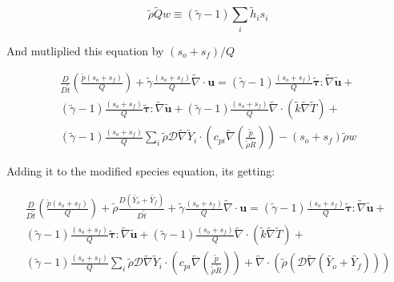 \documentclass[preprint,12pt,authoryear]{elsarticle}
\begin{document}
\begin{equation}
\tilde{\rho}\tilde{Q}w
\equiv
(\tilde{\gamma}-1)
\sum\limits_i
\tilde{h}_i
s_i	
\end{equation}

And mutliplied this equation by  $(s_o+s_f)/Q$

\begin{equation}
\begin{split}
	\frac{D }{D\tilde{t}}
	\left(
		\frac{\tilde{p}(s_o+s_f)}{Q}
	\right)
	+
	\tilde{\gamma}
	\frac{(s_o+s_f)}{Q}
	\tilde{\nabla}\cdot{\mathbf{u}}
        =
	(\tilde{\gamma}-1)
	\frac{(s_o+s_f)}{Q}
        \pmb{\tilde{\tau}}:\tilde{\nabla} \tilde{\mathbf{u}} 
        + 
	\\
	(\tilde{\gamma}-1)
	\frac{(s_o+s_f)}{Q}
        \pmb{\tilde{\tau}}:\tilde{\nabla} \tilde{\mathbf{u}} 
        + 
	(\tilde{\gamma}-1)
	\frac{(s_o+s_f)}{Q}
        \tilde{\nabla} \cdot (\tilde{k}\tilde{\nabla} \tilde{T})
        +
	\\
	(\tilde{\gamma}-1)
	\frac{(s_o+s_f)}{Q}
        \sum\limits_i 
        \tilde{\rho}
        \mathcal{D}
        \tilde{\nabla}
        \tilde{Y}_i     
        \cdot
        \left(
                c_{pi}
                \tilde{\nabla}
                \left(
                	\frac{\tilde{p}}{\tilde{\rho}\tilde{R}}
                \right)
        \right)
	- 
	(s_o+s_f)
	\tilde{\rho}w
\end{split}
\end{equation}

Adding it to the modified species equation, its getting:

\begin{equation}
\begin{split}
	\frac{D }{D\tilde{t}}
	\left(
		\frac{\tilde{p}(s_o+s_f)}{Q}
	\right)
	+
	\tilde{\rho} \frac{D  (\tilde{Y_o}+\tilde{Y_f})}{D \tilde{t}}
	+
	\tilde{\gamma}
	\frac{(s_o+s_f)}{Q}
	\tilde{\nabla}\cdot{\mathbf{u}}
        =
	(\tilde{\gamma}-1)
	\frac{(s_o+s_f)}{Q}
        \pmb{\tilde{\tau}}:\tilde{\nabla} \tilde{\mathbf{u}} 
        + 
	\\
	(\tilde{\gamma}-1)
	\frac{(s_o+s_f)}{Q}
        \pmb{\tilde{\tau}}:\tilde{\nabla} \tilde{\mathbf{u}} 
        + 
	(\tilde{\gamma}-1)
	\frac{(s_o+s_f)}{Q}
        \tilde{\nabla} \cdot (\tilde{k}\tilde{\nabla} \tilde{T})
        +
	\\
	(\tilde{\gamma}-1)
	\frac{(s_o+s_f)}{Q}
        \sum\limits_i 
        \tilde{\rho}
        \mathcal{D}
        \tilde{\nabla}
        \tilde{Y}_i     
        \cdot
        \left(
                c_{pi}
                \tilde{\nabla}
                \left(
                	\frac{\tilde{p}}{\tilde{\rho}\tilde{R}}
                \right)
        \right)
	+
	\tilde{\nabla}
	\cdot
	\left( 
		\tilde{\rho} 
		\left( 
			\mathcal{D}\tilde{\nabla} (\tilde{Y_o}+\tilde{Y_f})
		\right) 
	\right) 
\end{split}
\end{equation}
\end{document}
